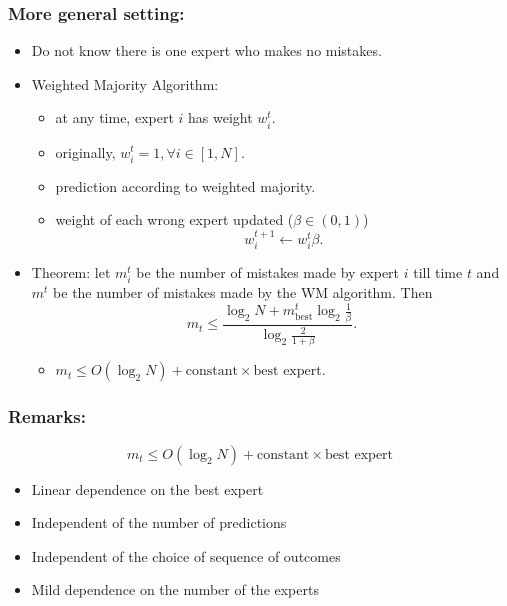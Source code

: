 \documentclass{beamer}
\begin{document}
\begin{frame}
\frametitle{More general setting:}
\begin{itemize}
\item Do not know there is one expert who makes no mistakes. 
\pause
\item Weighted Majority Algorithm:
\begin{itemize}
	\item at any time, expert $i$ has weight $w_i^t$.
	\item originally, $w_i^t = 1, \forall i\in[1,N]$.
	\item prediction according to weighted majority. 
	\item weight of each wrong expert updated ($\beta\in(0,1)$)
	$$w_i^{t+1}\leftarrow w_i^t\beta.$$
\end{itemize}
\pause
\item Theorem: let $m_i^t$ be the number of mistakes made by expert $i$ till time $t$ and $m^t$ be the number of mistakes made by the WM algorithm. Then
$$m_t \le \frac{\log_2 N+m_{\text{best}}^t\log_2\frac{1}{\beta}}{\log_2 \frac{2}{1+\beta}}.$$
\begin{itemize}
\item $m_t\le O(\log_2 N)+\text{constant}\times\text{best expert}$.
\end{itemize}

\end{itemize}
\end{frame}


\begin{frame}
\frametitle{Remarks:}
$$m_t\le O(\log_2 N)+\text{constant}\times\text{best expert}$$
\begin{itemize}
\item Linear dependence on the best expert
\pause
\item Independent of the number of predictions
\pause
\item Independent of the choice of sequence of outcomes
\pause
\item Mild dependence on the number of the experts
\end{itemize}


\end{frame}
\end{document}
